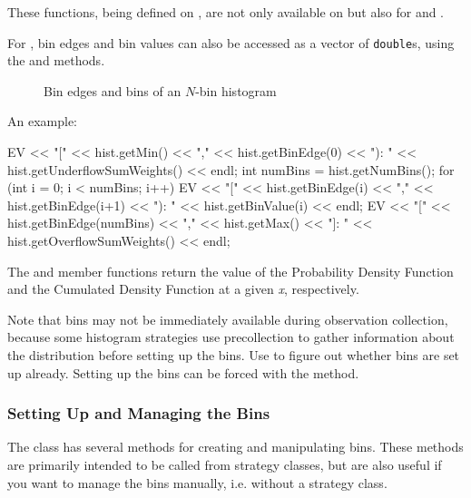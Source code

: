 These functions, being defined on , are not only
available on  but also for  and .

For , bin edges and bin values can also be accessed
as a vector of \texttt{double}s, using the  and
 methods.

\begin{figure}[htbp]
  \begin{center}
    
    \caption{Bin edges and bins of an $N$-bin histogram}
  \end{center}
\end{figure}

An example:

\begin{cpp}
EV << "[" << hist.getMin() << "," << hist.getBinEdge(0) << "): "
   << hist.getUnderflowSumWeights() << endl;
int numBins = hist.getNumBins();
for (int i = 0; i < numBins; i++) {
  EV << "[" << hist.getBinEdge(i) << "," << hist.getBinEdge(i+1) << "): "
     << hist.getBinValue(i) << endl;
}
EV << "[" << hist.getBinEdge(numBins) << "," << hist.getMax() << "]: "
   << hist.getOverflowSumWeights() << endl;
\end{cpp}

The  and  member functions
return the value of the Probability Density Function and the Cumulated
Density Function at a given \textit{x}, respectively.

Note that bins may not be immediately available during observation
collection, because some histogram strategies use precollection
to gather information about the distribution before setting up the bins.
Use  to figure out whether bins are
set up already. Setting up the bins can be forced with the
 method.


\subsubsection{Setting Up and Managing the Bins}
\label{sec:sim-lib:setting-up-bins}

The  class has several methods for creating and
manipulating bins. These methods are primarily intended to be called
from strategy classes, but are also useful if you want to manage
the bins manually, i.e. without a strategy class.

